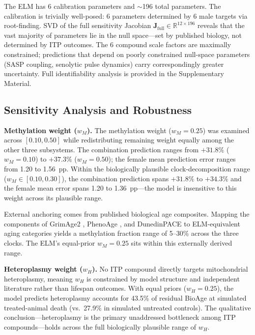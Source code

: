 \documentclass[11pt]{article}
\begin{document}
The ELM has 6 calibration parameters and $\sim$196 total parameters. The calibration is trivially well-posed: 6 parameters determined by 6 male targets via root-finding. SVD of the full sensitivity Jacobian $\mathbf{J}_{\text{full}} \in \mathbb{R}^{12 \times 196}$ reveals that the vast majority of parameters lie in the null space---set by published biology, not determined by ITP outcomes. The 6 compound scale factors are maximally constrained; predictions that depend on poorly constrained null-space parameters (SASP coupling, senolytic pulse dynamics) carry correspondingly greater uncertainty. Full identifiability analysis is provided in the Supplementary Material.

\subsection{Sensitivity Analysis and Robustness}

\textbf{Methylation weight ($w_M$).} The methylation weight ($w_M = 0.25$) was examined across $[0.10, 0.50]$ while redistributing remaining weight equally among the other three subsystems. The combination prediction ranges from $+31.8\%$ ($w_M = 0.10$) to $+37.3\%$ ($w_M = 0.50$); the female mean prediction error ranges from 1.20 to 1.56~pp. Within the biologically plausible clock-decomposition range ($w_M \in [0.10, 0.30]$), the combination prediction spans $+31.8\%$ to $+34.3\%$ and the female mean error spans 1.20 to 1.36~pp---the model is insensitive to this weight across its plausible range.

External anchoring comes from published biological age composites. Mapping the components of GrimAge2 \citep{Lu2019}, PhenoAge \citep{Levine2018}, and DunedinPACE \citep{Belsky2022} to ELM-equivalent aging categories yields a methylation fraction range of 5--30\% across the three clocks. The ELM's equal-prior $w_M = 0.25$ sits within this externally derived range.


\textbf{Heteroplasmy weight ($w_H$).} No ITP compound directly targets mitochondrial heteroplasmy, meaning $w_H$ is constrained by model structure and independent literature rather than lifespan outcomes. With equal priors ($w_H = 0.25$), the model predicts heteroplasmy accounts for 43.5\% of residual BioAge at simulated treated-animal death (vs.\ 27.9\% in simulated untreated controls). The qualitative conclusion---heteroplasmy is the primary unaddressed bottleneck among ITP compounds---holds across the full biologically plausible range of $w_H$.
\end{document}
